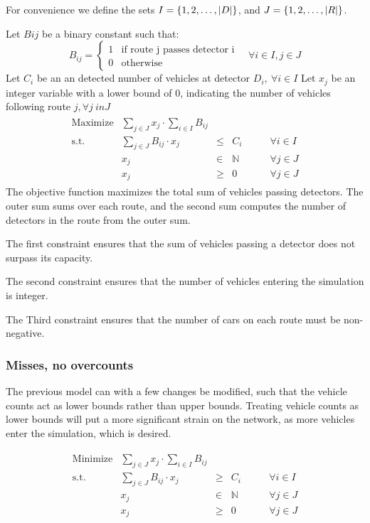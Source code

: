 For convenience we define the sets $I = \left\{1, 2, \ldots, |D|\right\}$, and $J = \left\{1, 2, \ldots, |R|\right\}$.

Let $B{ij}$ be a binary constant such that:
\[
  B_{ij} = \begin{cases}
    1 & \text{if route j passes detector i}\\
    0 & \text{otherwise}
  \end{cases}\quad \forall i \in I, j \in J
\]
Let $C_i$ be an an detected number of vehicles at detector $D_i,\ \forall i \in I$
Let $x_j$ be an integer variable with a lower bound of 0, indicating the number of vehicles following route $j, \forall j \ in J$
\begin{align*}
  \begin{array}{rrcll}
    \text{Maximize} & \displaystyle\sum_{j\in J}x_j \cdot \sum_{i\in I}B_{ij}&&&\\
    \text{s.t.} & \displaystyle\sum_{j\in J}B_{ij}\cdot x_j & \leq & C_i & \qquad \forall i \in I\\
    & x_j & \in & \mathbb{N}&\qquad \forall j \in J\\
    & x_j & \geq & 0&\qquad \forall j \in J
  \end{array}
\end{align*}
The objective function maximizes the total sum of vehicles passing detectors. The outer sum sums over each route, and the second sum computes the number of detectors in the route from the outer sum.

The first constraint ensures that the sum of vehicles passing a detector does not surpass its capacity.

The second constraint ensures that the number of vehicles entering the simulation is integer.

The Third constraint ensures that the number of cars on each route must be non-negative.

\subsubsection{Misses, no overcounts}
The previous model can with a few changes be modified, such that the vehicle counts act as lower bounds rather than upper bounds.
Treating vehicle counts as lower bounds will put a more significant strain on the network, as more vehicles enter the simulation, which is desired.

\begin{align*}
  \begin{array}{rrcll}
    \text{Minimize} & \displaystyle\sum_{j\in J}x_j \cdot \sum_{i\in I}B_{ij}&&&\\
    \text{s.t.} & \displaystyle\sum_{j\in J}B_{ij}\cdot x_j & \geq & C_i & \qquad \forall i \in I\\
    & x_j & \in & \mathbb{N}&\qquad \forall j \in J\\
    & x_j & \geq & 0&\qquad \forall j \in J
  \end{array}
\end{align*}

